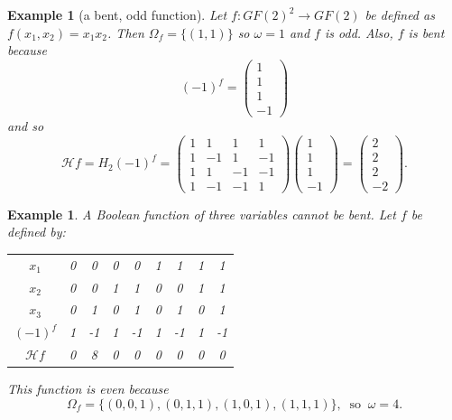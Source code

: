 \documentclass[12pt]{article}
\newtheorem{example}[theorem]{Example}
\newcommand{\Hcal}{{\mathcal{H}}}
\newcommand{\onef}{(-1)^f}
\begin{document}
\begin{example}[a bent, odd function]
  Let $f: GF(2)^2 \rightarrow GF(2)$ be defined as $f(x_1,x_2) = x_1
  x_2$. Then $\Omega_f = \{(1,1)\}$ so $\omega = 1$ and $f$ is odd.
  Also, $f$ is bent because
  \[
  \onef =
  \begin{pmatrix}
    1 \\ 1 \\ 1 \\ -1
  \end{pmatrix}
  \]
  and so
  \[
  \Hcal f = H_2 \onef =
  \begin{pmatrix}
    1 & 1 & 1 & 1\\1 & -1 & 1 & -1\\1 & 1& -1 & -1\\
    1 & -1 & -1 & 1
  \end{pmatrix}
  \begin{pmatrix}
    1 \\ 1 \\ 1 \\ -1
  \end{pmatrix}
  =
  \begin{pmatrix}
    2 \\ 2 \\ 2 \\ -2
  \end{pmatrix}.
  \]
\end{example}

\begin{example}
\label{example:3vars}
A Boolean function of three variables cannot be bent. Let $f$ be
defined by:
\begin{center}
\begin{tabular}{c|cccccccc}
$x_1$                    & 0 & 0 & 0 & 0 & 1 & 1 & 1 & 1 \\
$x_2$                    & 0 & 0 & 1 & 1 & 0 & 0 & 1 & 1 \\
$x_3$                    & 0 & 1 & 0 & 1 & 0 & 1 & 0 & 1 \\ \hline
$\onef$                  & 1 & -1 & 1 & -1 & 1 & -1 & 1 & -1   \\
${\mathcal{H}}f$   & 0 & 8 & 0 & 0 & 0 & 0 & 0 & 0    \\
\end{tabular}
\end{center}

This function is even because
\[
\Omega_f = \{ (0,0,1),  (0,1,1),  (1,0,1),  (1,1,1) \},\ \mbox{ so } \
\omega = 4.
\]

\end{example}
\end{document}
